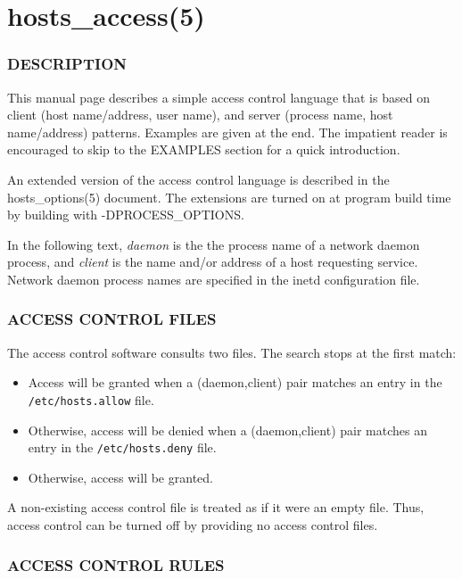 \documentclass[11pt,twoside,onecolumn]{book}
\begin{document}
\appendix
\chapter{hosts\_access(5)}

\subsection*{DESCRIPTION}

This manual page describes a simple access control language that is
based on client (host name/address, user name), and server (process
name, host name/address) patterns.  Examples are given at the end. The
impatient reader is encouraged to skip to the EXAMPLES section for a
quick introduction.

An extended version of the access control language is described in the
hosts\_options(5) document. The extensions are turned on at
program build time by building with -DPROCESS\_OPTIONS.

In the following text, {\em daemon} is the the process name of a
network daemon process, and {\em client} is the name and/or address of
a host requesting service. Network daemon process names are specified
in the inetd configuration file.

\subsection*{ACCESS CONTROL FILES}

The access control software consults two files. The search stops
at the first match:

\begin{itemize}
\item Access will be granted when a (daemon,client) pair matches an entry in
the {\tt /etc/hosts.allow} file.

\item Otherwise, access will be denied when a (daemon,client) pair matches an
entry in the {\tt /etc/hosts.deny} file.

\item Otherwise, access will be granted.

\end{itemize}

A non-existing access control file is treated as if it were an empty
file. Thus, access control can be turned off by providing no access
control files.

\subsection*{ACCESS CONTROL RULES}
\end{document}

